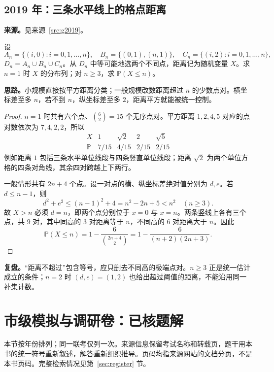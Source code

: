 \documentclass[UTF8,12pt,a4paper,fontset=fandol]{ctexart}
\begin{document}
\subsection{2019 年：三条水平线上的格点距离}\label{sec:g2019}
\textbf{来源。}见来源~\ref{src:g2019}。
\begin{example}[题意重述]
设
\[
A_n=\{(i,0):i=0,1,\ldots,n\},\quad
B_n=\{(0,1),(n,1)\},\quad
C_n=\{(i,2):i=0,1,\ldots,n\},
\]
$D_n=A_n\cup B_n\cup C_n$。从 $D_n$ 中等可能地选两个不同点，距离记为随机变量 $X$。求 $n=1$ 时 $X$ 的分布列；对 $n\geq3$，求 $\mathbb P(X\leq n)$。
\end{example}
\textbf{思路。}小规模直接按平方距离分类；一般规模改数距离超过 $n$ 的少数点对。横坐标差至多 $n$，若不到 $n$，纵坐标差至多 $2$，距离平方就能被统一控制。
\begin{proof}
$n=1$ 时共有六个点、$\binom62=15$ 个无序点对。平方距离 $1,2,4,5$ 对应的点对数依次为 $7,4,2,2$，所以
\[
\begin{array}{c|cccc}
X&1&\sqrt2&2&\sqrt5\\\hline
\mathbb P&7/15&4/15&2/15&2/15
\end{array}
\]
例如距离 $1$ 包括三条水平单位线段与四条竖直单位线段；距离 $\sqrt2$ 为两个单位方格的四条对角线，其余四对跨越上下两行。

一般情形共有 $2n+4$ 个点。设一对点的横、纵坐标差绝对值分别为 $d,e$。若 $d\leq n-1$，则
\[
d^2+e^2\leq(n-1)^2+4=n^2-2n+5<n^2\quad(n\geq3).
\]
故 $X>n$ 必须 $d=n$，即两个点分别位于 $x=0$ 与 $x=n$。两条竖线上各有三个点，共 $9$ 对，其中同高的 $3$ 对距离等于 $n$，不同高的 $6$ 对距离大于 $n$。因此
\[
\boxed{\mathbb P(X\leq n)=1-\frac6{\binom{2n+4}{2}}
=1-\frac6{(n+2)(2n+3)}}.
\]
\end{proof}
\textbf{复盘。}“距离不超过”包含等号，应只删去不同高的极端点对。$n\geq3$ 正是统一估计成立的条件；$n=2$ 时 $(d,e)=(1,2)$ 也给出超过阈值的距离，不能沿用同一补集计数。

\section{市级模拟与调研卷：已核题解}\label{sec:city}
本节按年份排列；同一联考仅列一次。来源信息保留考试名称和转载页，题干用本书的统一符号重新叙述，解答重新组织推导。页码均指来源网站的文档分页，不是本书页码。完整检索情况见第~\ref{sec:register} 节。
\end{document}
